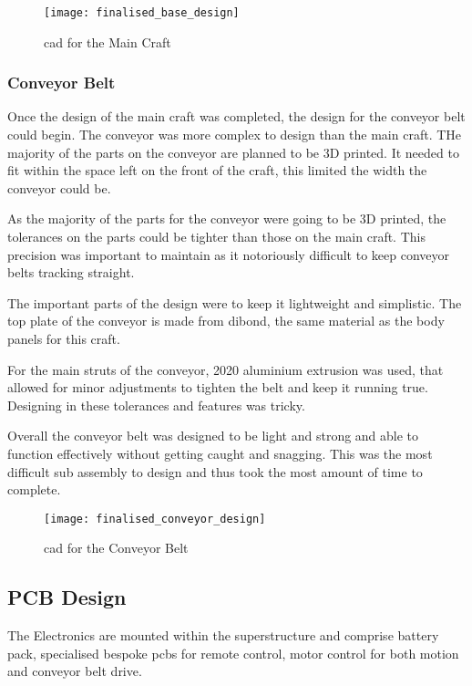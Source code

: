 \documentclass [11pt]{article}
\begin{document}
\begin{figure}[H]
\centerline{\texttt{[image: finalised\_base\_design]}}
\caption{\gls{cad} for the Main Craft}
\label{fig:finalised_base_design}
\end{figure}

\subsubsection{Conveyor Belt}\label{sec:conveyor_cad}

Once the design of the main craft was completed, the design for the conveyor belt could begin. The conveyor was more complex to design than the main craft. THe majority of the parts on the conveyor are planned to be 3D printed. It needed to fit within the space left on the front of the craft, this limited the width the conveyor could be. 

As the majority of the parts for the conveyor were going to be 3D printed, the tolerances on the parts could be tighter than those on the main craft. This precision was important to maintain as it notoriously difficult to keep conveyor belts tracking straight.

The important parts of the design were to keep it lightweight and simplistic. The top plate of the conveyor is made from \gls{dibond}, the same material as the body panels for this craft. 

For the main struts of the conveyor, 2020 aluminium extrusion was used, that allowed for minor adjustments to tighten the belt and keep it running true. Designing in these tolerances and features was tricky.  

Overall the conveyor belt was designed to be light and strong and able to function effectively without getting caught and snagging. This was the most difficult sub assembly to design and thus took the most amount of time to complete. 
 
\begin{figure}[H]
\centerline{\texttt{[image: finalised\_conveyor\_design]}}
\caption{\gls{cad} for the Conveyor Belt}
\label{fig:finalised_conveyor+_design}
\end{figure}

\subsection{PCB Design}\label{sec:pcb_design}

The Electronics are mounted within the superstructure and comprise battery pack, specialised bespoke \gls{pcb}s for remote control, motor control for both motion and conveyor belt drive.
\end{document}
